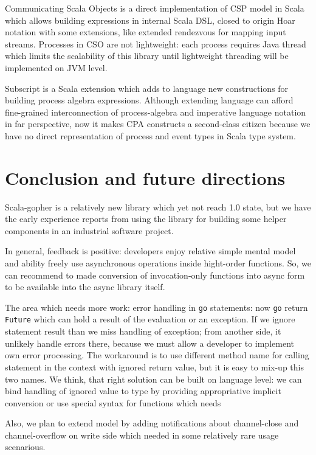 \documentclass[12pt]{article}
\begin{document}
 Communicating Scala Objects\cite{CSO} is a direct implementation of CSP model in Scala which allows
building expressions in internal Scala DSL, closed to origin Hoar notation with some extensions, like extended rendezvous for mapping input streams.  Processes in CSO are not lightweight: each process requires Java thread which limits the scalability of this library until lightweight threading will be implemented on JVM level.

 Subscript\cite{vanDelft:2013:DCL:2489837.2489849} is a Scala extension which adds to language new constructions for building process algebra expressions. Although extending language can afford fine-grained interconnection of process-algebra and imperative language notation in far perspective, now it makes CPA constructs a second-class citizen because we have no direct representation of process and event types in Scala type system.

  
\section{ Conclusion and future directions }
  
  Scala-gopher is a relatively new library which yet not reach 1.0 state, but we have the early experience
 reports from using the library for building some helper components in an industrial software project. 

 In general, feedback is positive: developers enjoy relative simple mental model and ability freely use asynchronous operations inside hight-order functions.  So, we can recommend to made conversion of invocation-only functions into async form to be available into the async library itself. 

 The area which needs more work: error handling in \verb|go| statements:  now \verb|go| return 
\verb|Future| which can hold a result of the evaluation or an exception. If we ignore statement result than we miss handling of exception; from another side, it unlikely handle errors there, because we must allow a developer to implement own error processing. The workaround is to use different method name for calling statement in the context with ignored return value, but it is easy to mix-up this two names.
 We think, that right solution can be built on language level: we can bind handling of ignored value to type by providing appropriative implicit conversion or use special syntax for functions which needs 
 
 Also, we plan to extend model by adding notifications about channel-close and channel-overflow on write side which needed in some relatively rare usage scenarious.
\end{document}
